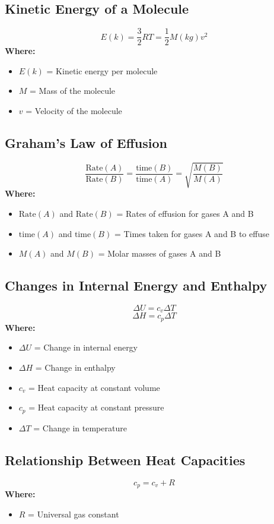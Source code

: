 \documentclass{report}
\begin{document}
\subsection*{Kinetic Energy of a Molecule}
\[
E(k) = \frac{3}{2} RT = \frac{1}{2} M(kg) v^2
\]
\textbf{Where:}
\begin{itemize}
    \item $E(k)$ = Kinetic energy per molecule
    \item $M$ = Mass of the molecule
    \item $v$ = Velocity of the molecule
\end{itemize}

\subsection*{Graham's Law of Effusion}
\[
\frac{\text{Rate}(A)}{\text{Rate}(B)} = \frac{\text{time}(B)}{\text{time}(A)} = \sqrt{\frac{M(B)}{M(A)}}
\]
\textbf{Where:}
\begin{itemize}
    \item $\text{Rate}(A)$ and $\text{Rate}(B)$ = Rates of effusion for gases A and B
    \item $\text{time}(A)$ and $\text{time}(B)$ = Times taken for gases A and B to effuse
    \item $M(A)$ and $M(B)$ = Molar masses of gases A and B
\end{itemize}

\subsection*{Changes in Internal Energy and Enthalpy}
\[
\Delta U = c_v \Delta T
\]
\[
\Delta H = c_p \Delta T
\]
\textbf{Where:}
\begin{itemize}
    \item $\Delta U$ = Change in internal energy
    \item $\Delta H$ = Change in enthalpy
    \item $c_v$ = Heat capacity at constant volume
    \item $c_p$ = Heat capacity at constant pressure
    \item $\Delta T$ = Change in temperature
\end{itemize}

\subsection*{Relationship Between Heat Capacities}
\[
c_p = c_v + R
\]
\textbf{Where:}
\begin{itemize}
    \item $R$ = Universal gas constant
\end{itemize}
\end{document}
